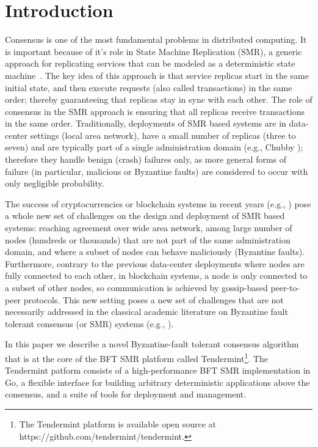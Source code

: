 \section{Introduction}
\label{sec:tendermint}

Consensus is one of the most fundamental problems in distributed computing. It is important because of it's role in State Machine Replication (SMR), a generic approach for replicating services that can be modeled as a deterministic state machine~\cite{Lam78:cacm, Sch90:survey}. The key idea of this approach is that service replicas start in the same initial state, and then execute requests (also called transactions) in the same order; thereby guaranteeing that replicas stay in sync with each other. The role of consensus in the SMR approach is ensuring that all replicas receive transactions in the same order. 
Traditionally, deployments of SMR based systems are in data-center settings (local area network), have a small number of replicas (three to seven) and are typically part of a single administration domain (e.g., Chubby \cite{Bur:osdi06}); therefore they handle benign (crash) failures only, as more general forms of failure (in particular, malicious or Byzantine faults) are considered to occur with only negligible probability.  

The success of cryptocurrencies or blockchain systems in recent years (e.g., \cite{Nak2012:bitcoin, But2014:ethereum}) pose a whole new set of challenges on the design and deployment of SMR based systems: reaching agreement over wide area network, among large number of nodes (hundreds or thousands) that are not part of the same administration domain, and where a subset of nodes can behave maliciously (Byzantine faults). Furthermore, contrary to the previous data-center deployments where nodes are fully connected to each other, in blockchain systems, a node is only connected to a subset of other nodes, so communication is achieved by gossip-based peer-to-peer protocols. This new setting poses a new set of challenges that are not necessarily addressed in the classical academic literature on Byzantine fault tolerant consensus (or SMR) systems (e.g., \cite{DLS88:jacm, CL02:tcs}).

In this paper we describe a novel Byzantine-fault tolerant consensus algorithm that is at the core of the BFT SMR platform called Tendermint\footnote{The Tendermint platform is available open source at https://github.com/tendermint/tendermint.}. The Tendermint patform consists
of a high-performance BFT SMR implementation in Go, a flexible interface for building arbitrary deterministic applications above the consensus, and a suite of tools for deployment and management.  

